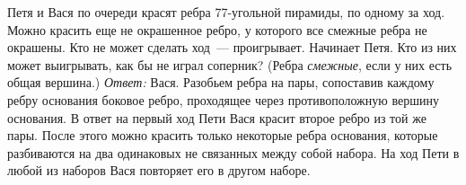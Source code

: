 \problem
Петя и Вася по очереди красят ребра 77-угольной пирамиды, по одному за ход.
Можно красить еще не окрашенное ребро, у которого все смежные ребра не
окрашены.
Кто не может сделать ход~--- проигрывает.
Начинает Петя.
Кто из них может выигрывать, как бы не играл соперник?
(Ребра \emph{смежные}, если у них есть общая вершина.)
\solution
\emph{Ответ:} Вася.
Разобьем ребра на пары, сопоставив каждому ребру основания боковое ребро,
проходящее через противоположную вершину основания.
В ответ на первый ход Пети Вася красит второе ребро из той же пары.
После этого можно красить только некоторые ребра основания, которые разбиваются
на два одинаковых не связанных между собой набора.
На ход Пети в любой из наборов Вася повторяет его в другом наборе.  
\endproblem
